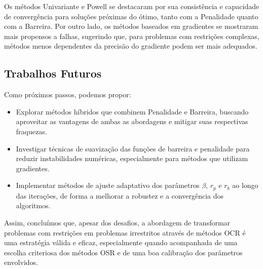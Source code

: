 \documentclass[a4paper, 12pt]{article}
\begin{document}
Os métodos Univariante e Powell se destacaram por sua consistência e capacidade de convergência para soluções próximas do ótimo, tanto com a Penalidade quanto com a Barreira. Por outro lado, os métodos baseados em gradientes se mostraram mais propensos a falhas, sugerindo que, para problemas com restrições complexas, métodos menos dependentes da precisão do gradiente podem ser mais adequados.

\subsection{Trabalhos Futuros}

Como próximos passos, podemos propor:

\begin{itemize}
    \item Explorar métodos híbridos que combinem Penalidade e Barreira, buscando aproveitar as vantagens de ambas as abordagens e mitigar suas respectivas fraquezas.
    \item Investigar técnicas de suavização das funções de barreira e penalidade para reduzir instabilidades numéricas, especialmente para métodos que utilizam gradientes.
    \item Implementar métodos de ajuste adaptativo dos parâmetros \(\beta\), \(r_p\) e \(r_b\) ao longo das iterações, de forma a melhorar a robustez e a convergência dos algoritmos.
\end{itemize}

Assim, concluímos que, apesar dos desafios, a abordagem de transformar problemas com restrições em problemas irrestritos através de métodos OCR é uma estratégia válida e eficaz, especialmente quando acompanhada de uma escolha criteriosa dos métodos OSR e de uma boa calibração dos parâmetros envolvidos.



\newpage
    \nocite{*}
    
    
\end{document}
